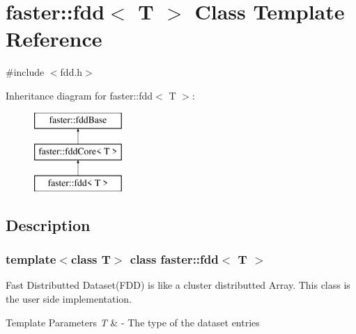 \hypertarget{classfaster_1_1fdd}{}\section{faster\+:\+:fdd$<$ T $>$ Class Template Reference}
\label{classfaster_1_1fdd}


{\ttfamily \#include $<$fdd.\+h$>$}

Inheritance diagram for faster\+:\+:fdd$<$ T $>$\+:\begin{figure}[H]
\begin{center}
\leavevmode
\includegraphics[height=3.000000cm]{classfaster_1_1fdd}
\end{center}
\end{figure}


\subsection{Description}
\subsubsection*{template$<$class T$>$\newline
class faster\+::fdd$<$ T $>$}

Fast Distributted Dataset(\+F\+D\+D) is like a cluster distributted Array. This class is the user side implementation. 


\begin{DoxyTemplParams}{Template Parameters}
{\em T} & -\/ The type of the dataset entries \\
\hline
\end{DoxyTemplParams}
